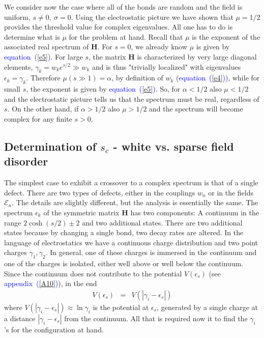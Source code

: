 \documentclass[aps,pre,floats,floatfix,twocolumn]{revtex4}
\newcommand{\beq}{\begin{eqnarray}}
\newcommand{\eeq}{\end{eqnarray}}
\newcommand{\Eq}[1]{\textcolor{blue}{{equation}\!~(\ref{#1})}}
\newcommand{\Ap}[1]{\textcolor{blue}{{appendix}\!~(\ref{#1})}}
\begin{document}
We consider now the case where all of the bonds are random and the field is uniform, $s\neq  0, \ \sigma=0$.
Using the electrostatic picture we have shown that $\mu=1/2$ provides the threshold value for complex eigenvalues. 
All one has to do is determine what is $\mu$ for the problem at hand. 
Recall that $\mu$ is the exponent of the associated real spectrum of ${\bm H}$.
For $s=0$, we already know $\mu$ is given by \Eq{e5}.
For large $s$, the matrix ${\bm H}$ is characterized by very large diagonal elements, ${\gamma_k = w_{k} e^{s/2} \gg w_k}$
and is thus "trivially localized" with eigenvalues $\epsilon_k = \gamma_k$. 
Therefore $\mu(s\gg 1) = \alpha$, by definition of $w_k$ (\Eq{e4}), 
while for small $s$, the exponent is given by \Eq{e5}.
So, for ${\alpha<1/2}$ also $\mu<1/2$ and the electrostatic picture tells us that the spectrum must be real, regardless of $s$.
On the other hand, if $\alpha>1/2$ also $\mu>1/2$ and the spectrum will become complex for any finite $s>0$.



\subsection{Determination of $s_c$ - white vs. sparse field disorder} 

The simplest case to exhibit a crossover to a complex spectrum is that of a single defect. 
There are two types of defects, either in the couplings $w_n$ or in the fields $\mathcal{E}_n$. 
The details are slightly different, but the analysis is essentially the same. 
The spectrum $\epsilon_k$ of the symmetric matrix $\bm{H}$ has two components: 
A continuum in the range $2\cosh(s/2)\pm 2$ and two additional states.
There are two additional states because by changing a single bond, two decay rates are altered. 
In the language of electrostatics we have a continuous charge distribution and two point charges 
$\gamma_1,\gamma_2$.
In general, one of these charges is immersed in the continuum and one of the charges is isolated, either well above or well below the continuum. 
Since the continuum does not contribute to the potential $V(\epsilon_s)$ (see \Ap{A10}), 
in the end 
%
\beq
V(\epsilon_s) &=&V(|\gamma_i - \epsilon_s|)
\eeq
%
where $V(|\gamma_i - \epsilon_s|) \approx \ln\gamma_i$ 
is the potential at $\epsilon_s$, generated by a single charge at a distance $|\gamma_i-\epsilon_s|$ from the continuum.
All that is required now it to find the $\gamma_i$'s for the configuration at hand.
\end{document}
